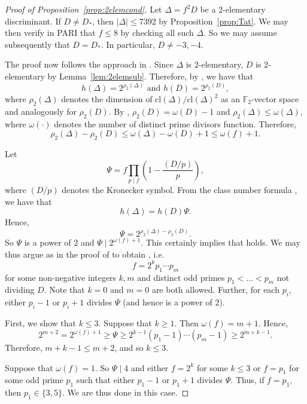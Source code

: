 \documentclass[12pt,a4paper,oneside]{amsart}
\begin{document}
\begin{proof}[Proof of Proposition~\ref{prop:2elemcond}]
Let $\Delta = f^2 D$ be a $2$-elementary discriminant. If $D \neq D_*$, then $\lvert \Delta \rvert \leq 7392$ by Proposition~\ref{prop:Tat}. We may then verify in PARI that $f \leq 8$ by checking all such $\Delta$. So we may assume subsequently that $D = D_*$. In particular, $D \neq -3, -4$.
	
	The proof now follows the approach in \cite[Prop.~2.9]{BiluGunTron22}. Since $\Delta$ is $2$-elementary, $D$ is $2$-elementary by Lemma~\ref{lem:2elemsub}. Therefore, by \cite[(2.9)]{BiluGunTron22}, we have that
	\[ h(\Delta) = 2^{\rho_2(\Delta)} \mbox{ and } h(D) = 2^{\rho_2(D)},\]
	where $\rho_2(\Delta)$ denotes the dimension of $\mathrm{cl}(\Delta) / \mathrm{cl}(\Delta)^2$ as an $\mathbb{F}_2$-vector space and analogously for $\rho_2(D)$. By \cite[Prop.~2.3]{BiluGunTron22}, $\rho_2(D) = \omega(D) -1$ and $\rho_2(\Delta) \leq \omega(\Delta)$, where $\omega(\cdot)$ denotes the number of distinct prime divisors function. Therefore,
	\[ \rho_2(\Delta) - \rho_2(D) \leq \omega(\Delta) - \omega(D) + 1 \leq \omega(f) + 1.\]
	
	Let
	\[ \Psi = f \prod_{p \mid f} \left(1 - \frac{\left(D/p\right)}{p}\right),\]
	where $(D/p)$ denotes the Kronecker symbol. From the class number formula \cite[(2.4) \& (2.5)]{BiluGunTron22}, we have that
	\[ h(\Delta) = h(D) \Psi.\]
	Hence,
	\[ \Psi = 2^{\rho_2(\Delta) - \rho_2(D)}.\]
	So $\Psi$ is a power of $2$ and $\Psi \mid 2^{\omega(f) + 1}$. This certainly implies that \cite[(2.12)]{BiluGunTron22} holds.  We may thus argue as in the proof of \cite[Prop.~2.9]{BiluGunTron22} to obtain \cite[(2.15)]{BiluGunTron22}, i.e.
	\[ f = 2^k p_1 \cdots p_m\]
	for some non-negative integers $k, m$ and distinct odd primes $p_1 < \ldots < p_m$ not dividing $D$. Note that $k=0$ and $m=0$ are both allowed. Further, for each $p_i$, either $p_i - 1$ or $p_i + 1$ divides $\Psi$ (and hence is a power of $2$).
	
	First, we show that $k \leq 3$. Suppose that $k \geq 1$. Then $\omega(f) = m + 1$. Hence,
	\[ 2^{m+2} = 2^{\omega(f)+1} \geq \Psi \geq 2^{k-1} (p_1 - 1) \cdots (p_m - 1) \geq 2^{m + k - 1}.\]
	Therefore, $m + k - 1 \leq m + 2$, and so $k \leq 3$. 
	
	Suppose that $\omega(f) = 1$. So $\Psi \mid 4$ and either $f = 2^k$ for some $k \leq 3$ or $f = p_1$ for some odd prime $p_1$ such that either $p_1 - 1$ or $p_1 + 1$ divides $\Psi$. Thus, if $f = p_1$, then $p_1 \in \{3, 5\}$. We are thus done in this case.
	

\end{proof}
\end{document}
